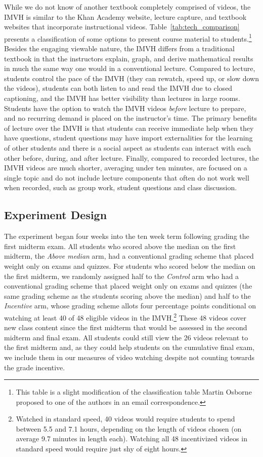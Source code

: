 \documentclass[12pt]{article}
\begin{document}
While we do not know of another textbook completely comprised of videos, the IMVH is similar to the Khan Academy website, lecture capture, and textbook websites that incorporate instructional videos.
Table~\ref{tab:tech_comparison} presents a classification of some options to present course material to students.\footnote{This table is a slight modification of the classification table Martin Osborne proposed to one of the authors in an email correspondence.} Besides the engaging viewable nature, the IMVH differs from a traditional textbook in that the instructors explain, graph, and derive mathematical results in much the same way one would in a conventional lecture.
Compared to lecture, students control the pace of the IMVH (they can rewatch, speed up, or slow down the videos), students can both listen to and read the IMVH due to closed captioning, and the IMVH has better visibility than lectures in large rooms.
Students have the option to watch the IMVH videos \textit{before} lecture to prepare, and no recurring demand is placed on the instructor's time.
The primary benefits of lecture over the IMVH is that students can receive immediate help when they have questions, student questions may have import externalities for the learning of other students and there is a social aspect as students can interact with each other before, during, and after lecture.
Finally, compared to recorded lectures, the IMVH videos are much shorter, averaging under ten minutes, are focused on a single topic and do not include lecture components that often do not work well when recorded, such as group work, student questions and class discussion.

\subsection{Experiment Design} \label{subsec:expdesign}

The experiment began four weeks into the ten week term following grading the first midterm exam.
All students who scored above the median on the first midterm, the \textit{Above median} arm, had a conventional grading scheme that placed weight only on exams and quizzes.
For students who scored below the median on the first midterm, we randomly assigned half to the  \textit{Control} arm who had a conventional grading scheme that placed weight only on exams and quizzes (the same grading scheme as the students scoring above the median) and half to the \textit{Incentive} arm, whose grading scheme allots four percentage points conditional on watching at least 40 of 48 eligible videos in the IMVH.\footnote{Watched in standard speed, 40 videos would require students to spend between 5.5 and 7.1 hours, depending on the length of videos chosen (on average 9.7 minutes in length each). Watching all 48 incentivized videos in standard speed would require just shy of eight hours.} These 48 videos cover new class content since the first midterm that would be assessed in the second midterm and final exam.
All students could still view the 26 videos relevant to the first midterm and, as they could help students on the cumulative final exam, we include them in our measures of video watching despite not counting towards the grade incentive.
\end{document}
